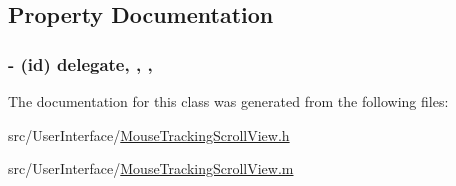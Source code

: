 \subsection{Property Documentation}
\hypertarget{interface_mouse_tracking_scroll_view_a8d9332fcd23523b1e2520b8765577423}{
\subsubsection[{delegate}]{\setlength{\rightskip}{0pt plus 5cm}-\/ (id) delegate\hspace{0.3cm}{\ttfamily [read]}, {\ttfamily [write]}, {\ttfamily [atomic]}, {\ttfamily [assign]}}}\label{interface_mouse_tracking_scroll_view_a8d9332fcd23523b1e2520b8765577423}


The documentation for this class was generated from the following files\-:\begin{DoxyCompactItemize}
\item 
src/\-User\-Interface/\hyperlink{_mouse_tracking_scroll_view_8h}{Mouse\-Tracking\-Scroll\-View.\-h}\item 
src/\-User\-Interface/\hyperlink{_mouse_tracking_scroll_view_8m}{Mouse\-Tracking\-Scroll\-View.\-m}\end{DoxyCompactItemize}
